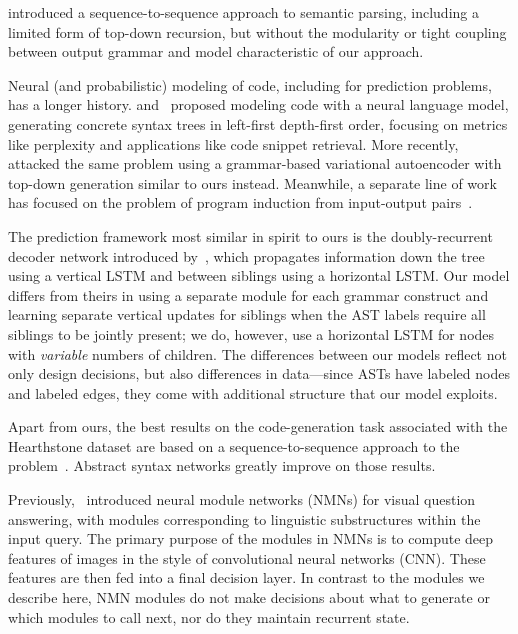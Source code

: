 \documentclass[11pt,a4paper]{article}
\newcommand{\HS}{{\sc Hearthstone}\xspace}
\begin{document}
\citet{Dong16Semantic} introduced a sequence-to-sequence approach to semantic parsing, including a limited form of top-down recursion, but without the modularity or tight coupling between output grammar and model characteristic of our approach. 


Neural (and probabilistic) modeling of code, including for prediction problems, has a longer history. \citet{Allamanis15Bimodal} and~\citet{ Maddison14SourceCode} proposed modeling code with a neural language model, generating concrete syntax trees in left-first depth-first order, focusing on metrics like perplexity and applications like code snippet retrieval. More recently, \citet{Shin17VAE} attacked the same problem using a grammar-based variational autoencoder with top-down generation similar to ours instead. Meanwhile, a separate line of work has focused on the problem of program induction from input-output pairs~\citep{Balog16DeepCoder,Liang10LearningPrograms,Menon13MLProgramming}.


The prediction framework most similar in spirit to ours is the doubly-recurrent decoder network introduced by~\citet{AlvarezMelis17Doubly}, which propagates information down the tree using a vertical LSTM and between siblings using a horizontal LSTM. Our model differs from theirs in using a separate module for each grammar construct and learning separate vertical updates for siblings when the AST labels require all siblings to be jointly present; we do, however, use a horizontal LSTM for nodes with {\it variable} numbers of children. The differences between our models reflect not only design decisions, but also differences in data---since ASTs have labeled nodes and labeled edges, they come with additional structure that our model exploits. 


Apart from ours, the best results on the code-generation task associated with the \HS dataset are based on a sequence-to-sequence approach to the problem~\citep{Ling16Code}. Abstract syntax networks greatly improve on those results. 

Previously,~\citet{Andreas16Neural} introduced neural module networks (NMNs) for visual question answering, with modules corresponding to linguistic substructures within the input query. The primary purpose of the modules in NMNs is to compute deep features of images in the style of convolutional neural networks (CNN). These features are then fed into a final decision layer. In contrast to the modules we describe here, NMN modules do not make decisions about what to generate or which modules to call next, nor do they maintain recurrent state. 
\end{document}
